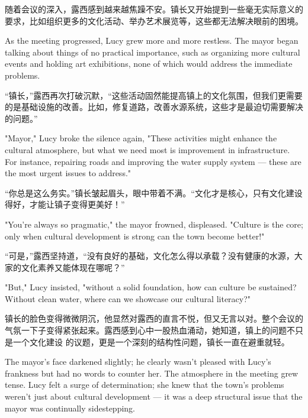 随着会议的深入，露西感到越来越焦躁不安。镇长又开始提到一些毫无实际意义的要求，比如组织更多的文化活动、举办艺术展览等，这些都无法解决眼前的困境。

\begin{flushright} As the meeting progressed, Lucy grew more and more restless.
    The mayor began talking about things of no practical importance, such as
    organizing more cultural events and holding art exhibitions, none of which
    would address the immediate problems. \end{flushright}

“镇长，”露西再次打破沉默，“这些活动固然能提高镇上的文化氛围，但我们更需要的是基础设施的改善。比如，修复道路，改善水源系统，这些才是最迫切需要解决的问题。”

\begin{flushright} "Mayor," Lucy broke the silence again, "These activities
    might enhance the cultural atmosphere, but what we need most is improvement
    in
    infrastructure. For instance, repairing roads and improving the water
    supply
    system — these are the most urgent issues to address." \end{flushright}

“你总是这么务实。”镇长皱起眉头，眼中带着不满。“文化才是核心，只有文化建设得好，才能让镇子变得更美好！”

\begin{flushright} "You’re always so pragmatic," the mayor frowned, displeased.
    "Culture is the core; only when cultural development is strong can the town
    become better!" \end{flushright}

“可是，”露西坚持道，“没有良好的基础，文化怎么得以承载？没有健康的水源，大家的文化素养又能体现在哪呢？”

\begin{flushright} "But," Lucy insisted, "without a solid foundation, how can
    culture be sustained? Without clean water, where can we showcase our
    cultural
    literacy?" \end{flushright}

镇长的脸色变得微微阴沉，他显然对露西的直言不悦，但又无言以对。整个会议的气氛一下子变得紧张起来。露西感到心中一股热血涌动，她知道，镇上的问题不只是一个文化建设
的议题，更是一个深刻的结构性问题，镇长一直在避重就轻。

\begin{flushright} The mayor’s face darkened slightly; he clearly wasn’t
    pleased with Lucy’s frankness but had no words to counter her. The
    atmosphere
    in the meeting grew tense. Lucy felt a surge of determination; she knew
    that
    the town’s problems weren’t just about cultural development — it was a deep
    structural issue that the mayor was continually sidestepping.
\end{flushright}

